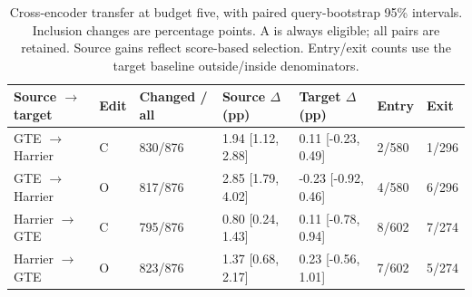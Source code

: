 \begin{table}[t]
\centering\footnotesize
\setlength{\tabcolsep}{3pt}
\caption{Cross-encoder transfer at budget five, with paired query-bootstrap 95\% intervals. Inclusion changes are percentage points. A is always eligible; all pairs are retained. Source gains reflect score-based selection. Entry/exit counts use the target baseline outside/inside denominators.}
\label{tab:transfer_visibility}
\begin{tabular}{lllllll}
\toprule
Source $\to$ target & Edit & Changed / all & Source $\Delta$ (pp) & Target $\Delta$ (pp) & Entry & Exit \\
\midrule
GTE $\to$ Harrier & C & 830/876 & 1.94 [1.12, 2.88] & 0.11 [-0.23, 0.49] & 2/580 & 1/296 \\
GTE $\to$ Harrier & O & 817/876 & 2.85 [1.79, 4.02] & -0.23 [-0.92, 0.46] & 4/580 & 6/296 \\
Harrier $\to$ GTE & C & 795/876 & 0.80 [0.24, 1.43] & 0.11 [-0.78, 0.94] & 8/602 & 7/274 \\
Harrier $\to$ GTE & O & 823/876 & 1.37 [0.68, 2.17] & 0.23 [-0.56, 1.01] & 7/602 & 5/274 \\
\bottomrule
\end{tabular}
\end{table}

